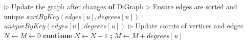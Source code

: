 \begin{algorithm}[hbtp]
\begin{algorithmic}[1]
\Statex

\State $\rhd$ Update the graph after changes
 \textbf{of} DiGraph \label{alg:digraph--update-begin}
  \State $\rhd$ Ensure edges are sorted and unique
    \ForAll{$u \in [0, CAP)$ \textbf{in parallel}}
      \State $sortByKey(edges[u], degrees[u])$
    \EndFor
  \EndIf
    \ForAll{$u \in [0, CAP)$ \textbf{in parallel}}
      \State $uniqueByKey(edges[u], degrees[u])$
    \EndFor
  \EndIf
  \State $\rhd$ Update counts of vertices and edges
  \State $N \gets M \gets 0$
  \ForAll{$u \in [0, CAP)$ \textbf{in parallel}}
     \textbf{continue}
    \EndIf
    \State $N \gets N + 1$ \textbf{;} $M \gets M + degrees[u]$
  \EndFor
\EndFunction \label{alg:digraph--update-end}
\end{algorithmic}
\end{algorithm}
